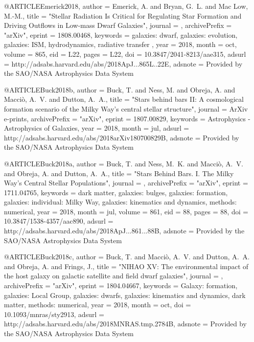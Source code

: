 \documentclass[useAMS,usenatbib]{mnras}
\begin{document}
{{{{{{{{{{{{{{{@ARTICLE{Emerick2018,
   author = {{Emerick}, A. and {Bryan}, G.~L. and {Mac Low}, M.-M.},
    title = "{Stellar Radiation Is Critical for Regulating Star Formation and Driving Outflows in Low-mass Dwarf Galaxies}",
  journal = {\apjl},
archivePrefix = "arXiv",
   eprint = {1808.00468},
 keywords = {galaxies: dwarf, galaxies: evolution, galaxies: ISM, hydrodynamics, radiative transfer },
     year = 2018,
    month = oct,
   volume = 865,
      eid = {L22},
    pages = {L22},
      doi = {10.3847/2041-8213/aae315},
   adsurl = {http://adsabs.harvard.edu/abs/2018ApJ...865L..22E},
  adsnote = {Provided by the SAO/NASA Astrophysics Data System}
}

@ARTICLE{Buck2018b,
   author = {{Buck}, T. and {Ness}, M. and {Obreja}, A. and {Macci{\`o}}, A.~V. and 
	{Dutton}, A.~A.},
    title = "{Stars behind bars II: A cosmological formation scenario of the Milky Way's central stellar structure}",
  journal = {ArXiv e-prints},
archivePrefix = "arXiv",
   eprint = {1807.00829},
 keywords = {Astrophysics - Astrophysics of Galaxies},
     year = 2018,
    month = jul,
   adsurl = {http://adsabs.harvard.edu/abs/2018arXiv180700829B},
  adsnote = {Provided by the SAO/NASA Astrophysics Data System}
}

@ARTICLE{Buck2018a,
   author = {{Buck}, T. and {Ness}, M.~K. and {Macci{\`o}}, A.~V. and {Obreja}, A. and 
	{Dutton}, A.~A.},
    title = "{Stars Behind Bars. I. The Milky Way's Central Stellar Populations}",
  journal = {\apj},
archivePrefix = "arXiv",
   eprint = {1711.04765},
 keywords = {dark matter, galaxies: bulges, galaxies: formation, galaxies: individual: Milky Way, galaxies: kinematics and dynamics, methods: numerical},
     year = 2018,
    month = jul,
   volume = 861,
      eid = {88},
    pages = {88},
      doi = {10.3847/1538-4357/aac890},
   adsurl = {http://adsabs.harvard.edu/abs/2018ApJ...861...88B},
  adsnote = {Provided by the SAO/NASA Astrophysics Data System}
}

@ARTICLE{Buck2018c,
   author = {{Buck}, T. and {Macci{\`o}}, A.~V. and {Dutton}, A.~A. and {Obreja}, A. and 
	{Frings}, J.},
    title = "{NIHAO XV: The environmental impact of the host galaxy on galactic satellite and field dwarf galaxies}",
  journal = {\mnras},
archivePrefix = "arXiv",
   eprint = {1804.04667},
 keywords = {Galaxy: formation, galaxies: Local Group, galaxies: dwarfs, galaxies: kinematics and dynamics, dark matter, methods: numerical},
     year = 2018,
    month = oct,
      doi = {10.1093/mnras/sty2913},
   adsurl = {http://adsabs.harvard.edu/abs/2018MNRAS.tmp.2784B},
  adsnote = {Provided by the SAO/NASA Astrophysics Data System}
}

}}}}}}}}}}}}}}}
\end{document}

